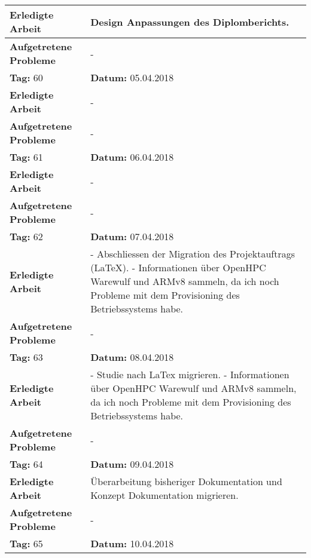 \begin{longtable}{|p{5cm}|p{5cm}p{6cm}|}
\textbf{Erledigte Arbeit} & \multicolumn{2}{p{11cm}|}{Design Anpassungen des Diplomberichts.} \\ \hline
\textbf{Aufgetretene Probleme} & \multicolumn{2}{p{11cm}|}{-} \\ \hline
\rowcolor{heading}\textbf{Tag:} 60 & \textbf{Datum:} 05.04.2018 & \\ \hline
\textbf{Erledigte Arbeit} & \multicolumn{2}{p{11cm}|}{-} \\ \hline
\textbf{Aufgetretene Probleme} & \multicolumn{2}{p{11cm}|}{-} \\ \hline
\rowcolor{heading}\textbf{Tag:} 61 & \textbf{Datum:} 06.04.2018 & \\ \hline
\textbf{Erledigte Arbeit} & \multicolumn{2}{p{11cm}|}{-} \\ \hline
\textbf{Aufgetretene Probleme} & \multicolumn{2}{p{11cm}|}{-} \\ \hline
\rowcolor{heading}\textbf{Tag:} 62 & \textbf{Datum:} 07.04.2018 & \\ \hline
\textbf{Erledigte Arbeit} & \multicolumn{2}{p{11cm}|}{- Abschliessen der Migration des Projektauftrags (LaTeX). \newline - Informationen über OpenHPC Warewulf und ARMv8 sammeln, da ich noch Probleme mit dem Provisioning des Betriebssystems habe.} \\ \hline
\textbf{Aufgetretene Probleme} & \multicolumn{2}{p{11cm}|}{-} \\ \hline
\rowcolor{heading}\textbf{Tag:} 63 & \textbf{Datum:} 08.04.2018 & \\ \hline
\textbf{Erledigte Arbeit} & \multicolumn{2}{p{11cm}|}{- Studie nach LaTex migrieren. \newline
- Informationen über OpenHPC Warewulf und ARMv8 sammeln, da ich noch Probleme mit dem Provisioning des Betriebssystems habe.} \\ \hline
\textbf{Aufgetretene Probleme} & \multicolumn{2}{p{11cm}|}{-} \\ \hline
\rowcolor{heading}\textbf{Tag:} 64 & \textbf{Datum:} 09.04.2018 & \\ \hline
\textbf{Erledigte Arbeit} & \multicolumn{2}{p{11cm}|}{Überarbeitung bisheriger Dokumentation und Konzept Dokumentation migrieren.} \\ \hline
\textbf{Aufgetretene Probleme \newline \newline} & \multicolumn{2}{p{11cm}|}{-} \\ \hline
\rowcolor{heading}\textbf{Tag:} 65 & \textbf{Datum:} 10.04.2018 & \\ \hline

\end{longtable}
